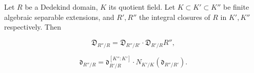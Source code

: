 Let $R$ be a Dedekind domain, $K$ its quotient field. Let $K \subset K' \subset K''$ be finite algebraic separable extensions, and $R', R''$ the integral closures of $R$ in $K', K''$ respectively. Then

$$\mathfrak{D}_{R''/R} = \mathfrak{D}_{R''/R'} \cdot \mathfrak{D}_{R'/R} R'',$$

$$\mathfrak{d}_{R''/R} = \mathfrak{d}_{R'/R}^{[K'':K']} \cdot N_{K'/K}(\mathfrak{d}_{R''/R'}).$$
